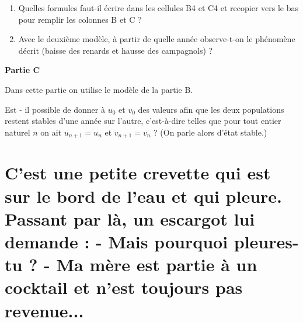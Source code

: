 \documentclass{cornouaille}
\begin{document}
\begin{exercice}
\medskip

\begin{enumerate}
\item Quelles formules faut-il écrire dans les cellules B4 et C4 et recopier vers le bas pour remplir
les colonnes B et C ?
\item  Avec le deuxième modèle, à partir de quelle année observe-t-on le phénomène décrit (baisse
des renards et hausse des campagnols) ?
\end{enumerate}

\bigskip

\textbf{Partie C}

\medskip

Dans cette partie on utilise le modèle de la partie B.

Est - il possible de donner à $u_0$ et $v_0$ des valeurs afin que les deux populations restent stables d'une
année sur l'autre, c'est-à-dire telles que pour tout entier naturel $n$ on ait $u_{n+1} = u_n$ et $v_{n+1} = v_n$ ? (On parle alors d'état stable.)
\end{exercice}

\section{C'est une petite crevette qui est sur le bord de l'eau et qui pleure. Passant par là, un escargot lui demande : - Mais pourquoi pleures-tu ? - Ma mère est partie à un cocktail et n'est toujours pas revenue...}
\end{document}
